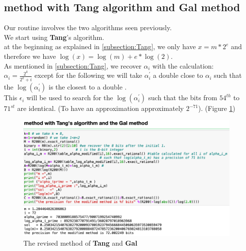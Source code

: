 \subsection{method with \textbf{Tang} algorithm and \textbf{Gal} method}
Our routine involves the two algorithms seen previously.\\
We start using \textbf{Tang}'s algorithm.\\
at the beginning as explained in \ref{subsection:Tang}, we only have $x=m*2^e$ and therefore we have $\log(x) = \log(m) +e*\log(2)$.\\
As mentioned in \ref{subsection:Tang}, we recover  $\alpha_i$ with the calculation:\\
$\alpha_i = \frac{2^k}{2^k+i}$ except for the following we will take $\alpha^{'}_i$ a double close to  $\alpha_i$ such that the $\log(\alpha^{'}_i)$ is the closest to a double .\\
This $\epsilon_i$ will be used to search for the $\log(\alpha^{'}_i)$ such that the bits from $54^{th}$ to $71^{st}$  are identical. (To have an approximation approximately  $2^{-71}$). (Figure \ref{fig:tang-gal})\\


\begin{figure}[H]
    \centering
    \includegraphics[scale = 0.49]{images/notre_met_Tang_Gal/algo_Tang_Gal.png}
    \caption{The revised method of \textbf{Tang} and \textbf{Gal}}\label{fig:tang-gal}
\end{figure}

